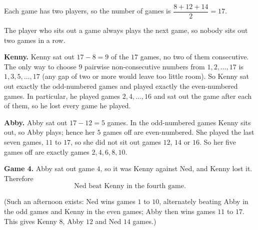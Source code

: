 Each game has two players, so the number of games is $\dfrac{8+12+14}{2}=17$.

The player who sits out a game always plays the next game, so nobody sits out two games in a row.

\textbf{Kenny.} Kenny sat out $17-8=9$ of the $17$ games, no two of them consecutive. The only way to choose $9$ pairwise non-consecutive numbers from $1,2,\dots,17$ is $1,3,5,\dots,17$ (any gap of two or more would leave too little room). So Kenny sat out exactly the odd-numbered games and played exactly the even-numbered games. In particular, he played games $2,4,\dots,16$ and sat out the game after each of them, so he lost every game he played.

\textbf{Abby.} Abby sat out $17-12=5$ games. In the odd-numbered games Kenny sits out, so Abby plays; hence her $5$ games off are even-numbered. She played the last seven games, $11$ to $17$, so she did not sit out games $12$, $14$ or $16$. So her five games off are exactly games $2,4,6,8,10$.

\textbf{Game 4.} Abby sat out game $4$, so it was Kenny against Ned, and Kenny lost it. Therefore
\[\boxed{\text{Ned beat Kenny in the fourth game.}}\]

(Such an afternoon exists: Ned wins games $1$ to $10$, alternately beating Abby in the odd games and Kenny in the even games; Abby then wins games $11$ to $17$. This gives Kenny $8$, Abby $12$ and Ned $14$ games.)
